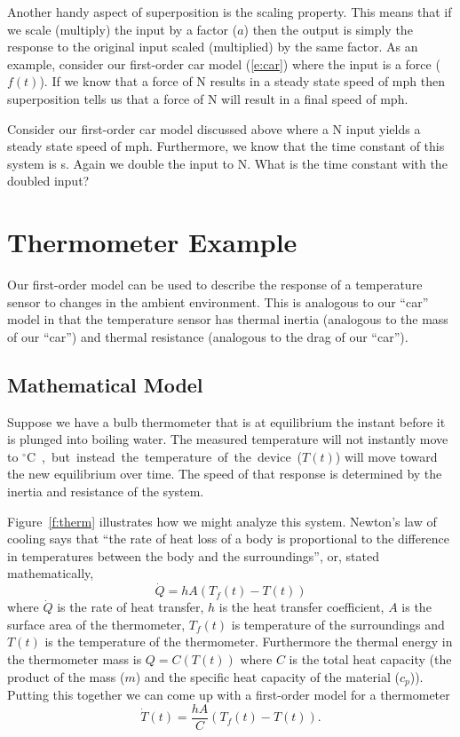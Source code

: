 Another handy aspect of superposition is the scaling property.  This means that if we scale (multiply) the input by a factor ($a$) then the output is simply the response to the original input scaled (multiplied) by the same factor.  As an example, consider our first-order car model (\ref{e:car}) where the input is a force ($f(t)$).  If we know that a force of \unit[1,000]{N} results in a steady state speed of \unit[25]{mph} then superposition tells us that a force of \unit[2,000]{N} will result in a final speed of \unit[50]{mph}.

\begin{ex}
Consider our first-order car model discussed above where a \unit[1,000]{N} input yields a steady state speed of \unit[25]{mph}.  Furthermore, we know that the time constant of this system is \unit[2]{s}.  Again we double the input to \unit[2,000]{N}. What is the time constant with the doubled input?
\end{ex}

\section{Thermometer Example}
Our first-order model can be used to describe the response of a temperature sensor to changes in the ambient environment.  This is analogous to our ``car'' model in that the temperature sensor has thermal inertia (analogous to the mass of our ``car'') and thermal resistance (analogous to the drag of our ``car'').  

\subsection{Mathematical Model}
Suppose we have a bulb thermometer that is at equilibrium the instant before it is plunged into boiling water.  The measured temperature will not instantly move to \unit[100]{$^{\circ}$C}, but instead the temperature of the device ($T(t)$) will move toward the new equilibrium over time.  The speed of that response is determined by the inertia and resistance of the system.

Figure~\ref{f:therm} illustrates how we might analyze this system.  Newton's law of cooling says that ``the rate of heat loss of a body is proportional to the difference in temperatures between the body and the surroundings'', or, stated mathematically,
\begin{equation}
\dot{Q}=hA (T_f(t)-T(t))
\end{equation}
where $\dot{Q}$ is the rate of heat transfer, $h$ is the heat transfer coefficient, $A$ is the surface area of the thermometer, $T_f(t)$ is temperature of the surroundings and $T(t)$ is the temperature of the thermometer.  Furthermore the thermal energy in the thermometer mass is $Q=C(T(t))$ where $C$ is the total heat capacity (the product of the mass ($m$) and the specific heat capacity of the material ($c_p$)).  Putting this together we can come up with a first-order model for a thermometer
\begin{equation}
\label{e:therm}
\dot{T}(t)= \frac{hA}{C}(T_f(t)-T(t)).
\end{equation}

